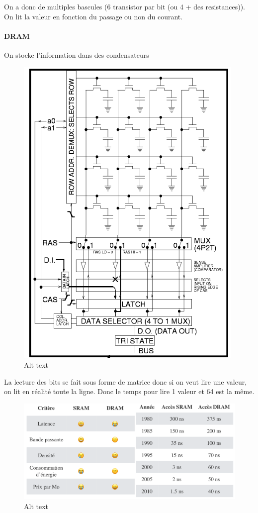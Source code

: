 On a donc de multiples bascules (6 transistor par bit (ou 4 + des
resistances)). On lit la valeur en fonction du passage ou non du
courant.

\paragraph{DRAM}\label{dram}

On stocke l'information dans des condensateurs

\begin{figure}
\centering
\includegraphics{image-9.png}
\caption{Alt text}
\end{figure}

La lecture des bits se fait sous forme de matrice donc si on veut lire
une valeur, on lit en réalité toute la ligne. Donc le temps pour lire 1
valeur et 64 est la même.

\begin{figure}
\centering
\includegraphics{image-10.png}
\caption{Alt text}
\end{figure}

